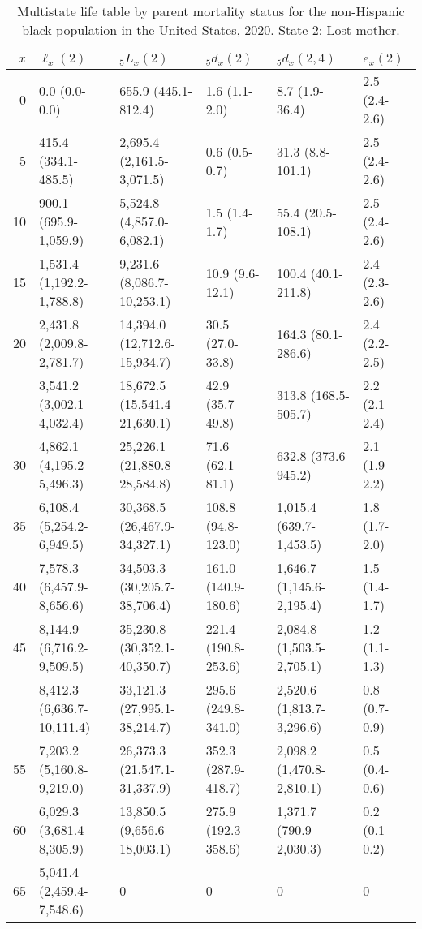 \begin{table}

\caption{Multistate life table by parent mortality status for the non-Hispanic black population in the United States, 2020. State 2: Lost mother.}
\centering
\begin{tabular}[t]{rlllll}
\toprule
$x$ & $\ell_x(2)$ & ${}_5 L_x(2)$ & ${}_5 d_x(2)$ & ${}_5 d_x(2,4)$ & $e_x(2)$\\
\midrule
0 & 0.0 (0.0-0.0) & 655.9 (445.1-812.4) & 1.6 (1.1-2.0) & 8.7 (1.9-36.4) & 2.5 (2.4-2.6)\\
5 & 415.4 (334.1-485.5) & 2,695.4 (2,161.5-3,071.5) & 0.6 (0.5-0.7) & 31.3 (8.8-101.1) & 2.5 (2.4-2.6)\\
10 & 900.1 (695.9-1,059.9) & 5,524.8 (4,857.0-6,082.1) & 1.5 (1.4-1.7) & 55.4 (20.5-108.1) & 2.5 (2.4-2.6)\\
15 & 1,531.4 (1,192.2-1,788.8) & 9,231.6 (8,086.7-10,253.1) & 10.9 (9.6-12.1) & 100.4 (40.1-211.8) & 2.4 (2.3-2.6)\\
20 & 2,431.8 (2,009.8-2,781.7) & 14,394.0 (12,712.6-15,934.7) & 30.5 (27.0-33.8) & 164.3 (80.1-286.6) & 2.4 (2.2-2.5)\\
\addlinespace
25 & 3,541.2 (3,002.1-4,032.4) & 18,672.5 (15,541.4-21,630.1) & 42.9 (35.7-49.8) & 313.8 (168.5-505.7) & 2.2 (2.1-2.4)\\
30 & 4,862.1 (4,195.2-5,496.3) & 25,226.1 (21,880.8-28,584.8) & 71.6 (62.1-81.1) & 632.8 (373.6-945.2) & 2.1 (1.9-2.2)\\
35 & 6,108.4 (5,254.2-6,949.5) & 30,368.5 (26,467.9-34,327.1) & 108.8 (94.8-123.0) & 1,015.4 (639.7-1,453.5) & 1.8 (1.7-2.0)\\
40 & 7,578.3 (6,457.9-8,656.6) & 34,503.3 (30,205.7-38,706.4) & 161.0 (140.9-180.6) & 1,646.7 (1,145.6-2,195.4) & 1.5 (1.4-1.7)\\
45 & 8,144.9 (6,716.2-9,509.5) & 35,230.8 (30,352.1-40,350.7) & 221.4 (190.8-253.6) & 2,084.8 (1,503.5-2,705.1) & 1.2 (1.1-1.3)\\
\addlinespace
50 & 8,412.3 (6,636.7-10,111.4) & 33,121.3 (27,995.1-38,214.7) & 295.6 (249.8-341.0) & 2,520.6 (1,813.7-3,296.6) & 0.8 (0.7-0.9)\\
55 & 7,203.2 (5,160.8-9,219.0) & 26,373.3 (21,547.1-31,337.9) & 352.3 (287.9-418.7) & 2,098.2 (1,470.8-2,810.1) & 0.5 (0.4-0.6)\\
60 & 6,029.3 (3,681.4-8,305.9) & 13,850.5 (9,656.6-18,003.1) & 275.9 (192.3-358.6) & 1,371.7 (790.9-2,030.3) & 0.2 (0.1-0.2)\\
65 & 5,041.4 (2,459.4-7,548.6) & 0 & 0 & 0 & 0\\
\bottomrule
\end{tabular}
\end{table}